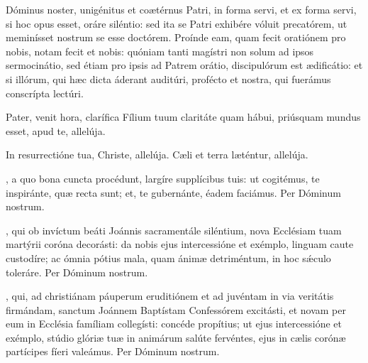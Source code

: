 \documentclass[fontsize=9pt,paper=A6,twoside,BCOR=1mm,DIV=22,headinclude]{scrarticle}
\renewcommand\A\Ant
\begin{document}
\begin{multicols}{2}
{
 Dóminus noster, unigénitus et coætérnus Patri, in forma servi, et ex forma servi, si hoc opus esset, oráre siléntio: sed ita se Patri exhibére vóluit precatórem, ut meminísset nostrum se esse doctórem. Proínde eam, quam fecit oratiónem pro nobis, notam fecit et nobis: quóniam tanti magístri non solum ad ipsos sermocinátio, sed étiam pro ipsis ad Patrem orátio, discipulórum est ædificátio: et si illórum, qui hæc dicta áderant auditúri, profécto et nostra, qui fuerámus conscrípta lectúri.

\Te 


\A Pater, venit hora, clarífica Fílium tuum claritáte quam hábui, priúsquam mundus esset, apud te, allelúja.

\V In resurrectióne tua, Christe, allelúja.
\R Cæli et terra læténtur, allelúja.

, a quo bona cuncta procédunt, largíre supplícibus tuis: ut cogitémus, te inspiránte, quæ recta sunt; et, te gubernánte, éadem faciámus. Per Dóminum nostrum.


}


\VRMTPi 

\MiMTP 

, qui ob invíctum beáti Joánnis sacramentále siléntium, nova Ecclésiam tuam martýrii coróna decorásti: da nobis ejus intercessióne et exémplo, linguam caute custodíre; ac ómnia pótius mala, quam ánimæ detriméntum, in hoc s\'æculo toleráre. Per Dóminum nostrum.


\AiiiCA

\VRCiiiA

, qui, ad christiánam páuperum eruditiónem et ad juvéntam in via veritátis firmándam, sanctum Joánnem Baptístam Confessórem excitásti, et novam per eum in Ecclésia famíliam collegísti: concéde propítius; ut ejus intercessióne et exémplo, stúdio glóriæ tuæ in animárum salúte fervéntes, ejus in cælis corónæ partícipes fíeri valeámus. \red{(}Per Dóminum nostrum.\red{)}


\end{multicols}
\end{document}
